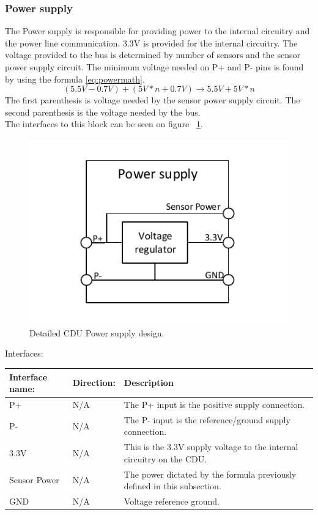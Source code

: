\subsubsection{Power supply}
The Power supply is responsible for providing power to the internal circuitry and the power line communication. 3.3V is provided for the internal circuitry. The voltage provided to the bus is determined by number of sensors and the sensor power supply circuit. The minimum voltage needed on P+ and P- pins is found by using the formula \ref{eq:powermath}.
\begin{equation}
( 5.5V - 0.7V ) + (5V * n + 0.7V) \rightarrow 5.5V + 5V * n
\label{eq:powermath}
\end{equation}
The first parenthesis is voltage needed by the sensor power supply circuit. The second parenthesis is the voltage needed by the bus.\\
The interfaces to this block can be seen on figure ~\ref{fig:CDUPS}.\\
\begin{figure}[H]
	\centering
	\includegraphics[scale=1]{billeder/CDUPS}
	\caption{Detailed CDU Power supply design.}
	\label{fig:CDUPS}
\end{figure}
Interfaces:
\begin{table}[H]
	\centering
	\begin{tabular}{|p{3cm} |p{3cm}| p{8cm}| }
		\hline
		Interface name: &Direction:	& Description \\ \hline
		P+ 				&N/A & The P+ input is the positive supply connection. \\ \hline
		P- 				&N/A & The P- input is the reference/ground supply connection. \\ \hline
		3.3V			&N/A & This is the 3.3V supply voltage to the internal circuitry on the CDU. \\ 	\hline
		Sensor Power	&N/A & The power dictated by the formula previously defined in this subsection. \\ \hline
		GND				&N/A & Voltage reference ground. \\\hline 
	\end{tabular}
\end{table}

